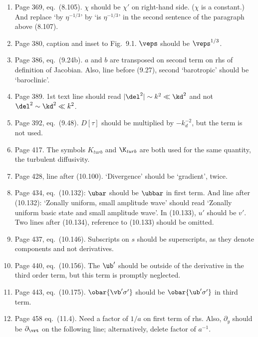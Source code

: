 \documentclass[10pt]{article}
\newcommand{\eq}{eq.\ } \newcommand{\Eq}{Eq.\ }
\begin{document}
\begin{enumerate}
\item Page 369, \eq (8.105). $\chi$ should be $\chi'$ on right-hand side. ($\chi$ is a constant.) And replace `by $\eta^{-1/3}$' by `is $\eta^{-1/3}$' in
the second sentence of the paragraph above (8.107).

\item Page 380, caption and inset to Fig.\ 9.1. $\veps$ should be $\veps^{1/3}$.

\item Page 386, \eq (9.24b). $a$ and $b$ are transposed on second term on rhs of definition of Jacobian. Also, line before (9.27), second `barotropic' should be `baroclinic'.

\item Page 389. 1st text line should read $|\del^2| \sim
k^2 \ll \kd^2$ and not $\del^2 \sim
\kd^2 \ll k^2$.

\item Page 392, \eq (9.48). $D[\tau]$ should be multiplied by $-k_d^{-2}$, but the term is not used.

\item Page 417. The symbols $K_{\textit{turb}}$ and $\K_{\textit{turb}}$ are both used for the same quantity, the turbulent diffusivity.

\item Page 428, line after (10.100). `Divergence' should be `gradient', twice.

\item Page 434, \eq (10.132): $\ubar$ should be $\ubbar$ in first term. And line after (10.132): `Zonally uniform, small amplitude wave' should read `Zonally uniform basic state and small amplitude wave'. In (10.133), $u'$ should be $v'$. Two lines after (10.134), reference to (10.133) should be omitted.

\item Page 437, \eq (10.146). Subscripts on $s$ should be superscripts, as they denote components and not derivatives.

\item Page 440, \eq (10.156). The $\ub'$ should be outside of the derivative in the third order term, but this term is promptly neglected.

\item Page 443, \eq (10.175). $\obar{\vb' \sigma'}$ should be $\obar{\ub' \sigma'}$ in third term.

\item Page 458 \eq (11.4). Need a factor of $1/a$ on first term of rhs. Also, $\partial_y$ should be $\partial_\vrt$ on the following line; alternatively, delete factor of $a^{-1}$.


\end{enumerate}
\end{document}
